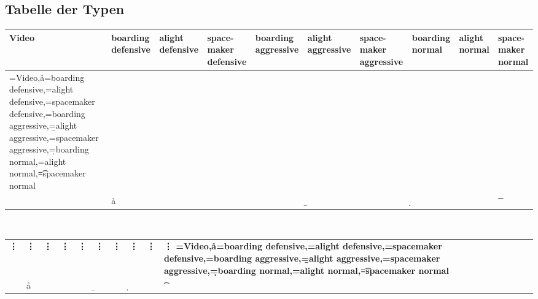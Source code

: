 \begin{appendix}
\section{Tabelle der Typen}
\begin{sidewaystable}[h!]
	\centering
	\begin{tabular}{ |p{1 cm} p{1.9 cm} p{1.9 cm} p{1.9 cm} p{2.1 cm} p{1.9 cm} p{2.1 cm} p{1.6 cm} p{1.5 cm} p{1.5 cm}|}
		\hline
		\bfseries Video & \bfseries boarding defensive & \bfseries alight defensive & \bfseries space-maker defensive  & \bfseries boarding aggressive & \bfseries alight aggressive & \bfseries space-maker aggressive & \bfseries boarding normal  & \bfseries alight normal & \bfseries space-maker normal \\
		\hline
		\DTLforeach*[\value{DTLrowi}<10]{Types}%
		{\video=Video,\aa=boarding defensive,\ab=alight defensive,\sp=spacemaker defensive,\be=boarding aggressive,\b=alight aggressive,\s=spacemaker aggressive,\d=boarding normal,\iw=alight normal,\t=spacemaker normal}
		{
		\\\video & \aa & \ab & \sp & \be & \b & \s &\d & \iw & \t}
	\end{tabular} \\
	\begin{tabular}{|p{1 cm} p{1.9 cm} p{1.9 cm} p{1.9 cm} p{2.1 cm} p{1.9 cm} p{2.1 cm} p{1.6 cm} p{1.5 cm} p{1.5 cm}|}
		\bfseries \vdots & \bfseries \vdots & \bfseries \vdots & \bfseries \vdots & \bfseries \vdots & \bfseries \vdots & \bfseries \vdots & \bfseries \vdots & \bfseries \vdots & \bfseries \vdots
		\DTLforeach*[\DTLisgt{\video}{3183}]{Types}
		{\video=Video,\aa=boarding defensive,\ab=alight defensive,\sp=spacemaker defensive,\be=boarding aggressive,\b=alight aggressive,\s=spacemaker aggressive,\d=boarding normal,\iw=alight normal,\t=spacemaker normal}
		{
		\\\video & \aa & \ab & \sp & \be & \b & \s &\d & \iw & \t}\\
		\hline
	\end{tabular}
	\caption{Typen von Prozesstypen: Zusatzmaterial \textsl{PeopleTypes.csv} }
	\label{tab:Types}
\end{sidewaystable}
\clearpage

\end{appendix}
